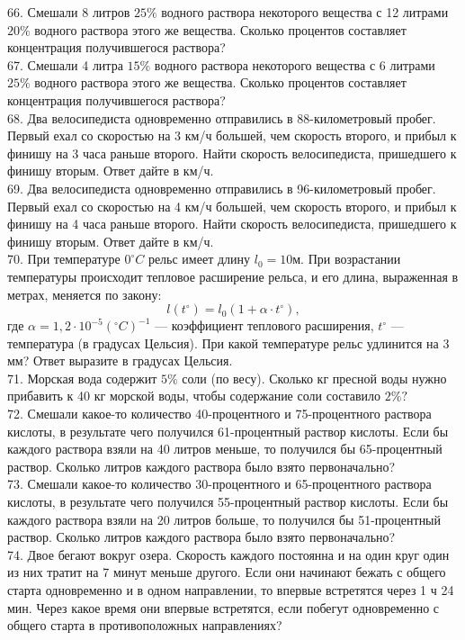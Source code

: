 66. Смешали 8 литров $25\%$ водного раствора некоторого вещества с 12 литрами $20\%$ водного раствора этого же вещества. Сколько процентов составляет концентрация получившегося раствора?\\
67. Смешали 4 литра $15\%$ водного раствора некоторого вещества с 6 литрами $25\%$ водного раствора этого же вещества. Сколько процентов составляет концентрация получившегося раствора?\\
68. Два велосипедиста одновременно отправились в 88-километровый пробег. Первый ехал со скоростью на 3 км/ч большей, чем скорость второго, и прибыл к финишу на 3 часа раньше второго. Найти скорость велосипедиста, пришедшего к финишу вторым. Ответ дайте в км/ч.\\
69. Два велосипедиста одновременно отправились в 96-километровый пробег. Первый ехал со скоростью на 4 км/ч большей, чем скорость второго, и прибыл к финишу на 4 часа раньше второго. Найти скорость велосипедиста, пришедшего к финишу вторым. Ответ дайте в км/ч.\\
70. При температуре $0^\circ C$ рельс имеет длину $l_0=10$м. При возрастании температуры происходит тепловое расширение рельса, и его длина, выраженная в метрах, меняется по закону:
$$l(t^\circ)=l_0(1+\alpha\cdot t^\circ),$$
где $\alpha=1,2\cdot10^{-5}(^\circ C)^{-1}$ --- коэффициент теплового расширения, $t^\circ$ --- температура (в градусах Цельсия). При какой температуре рельс удлинится на 3 мм? Ответ выразите в градусах Цельсия.\\
71. Морская вода содержит $5\%$ соли (по весу). Сколько кг пресной воды нужно прибавить к 40 кг морской воды, чтобы содержание соли составило $2\%?$\\
72. Смешали какое-то количество 40-процентного и 75-процентного раствора кислоты, в результате чего получился 61-процентный раствор кислоты. Если бы каждого раствора взяли на 40 литров меньше, то получился бы 65-процентный раствор. Сколько литров каждого раствора было взято первоначально?\\
73. Смешали какое-то количество 30-процентного и 65-процентного раствора кислоты, в результате чего получился 55-процентный раствор кислоты. Если бы каждого раствора взяли на 20 литров больше, то получился бы 51-процентный раствор. Сколько литров каждого раствора было взято первоначально?\\
74. Двое бегают вокруг озера. Скорость каждого постоянна и на один круг один из них тратит на 7 минут меньше другого. Если они начинают бежать с общего старта одновременно и в одном направлении, то впервые встретятся через 1 ч 24 мин. Через какое время они впервые встретятся, если побегут одновременно с общего старта в противоположных направлениях?\\

